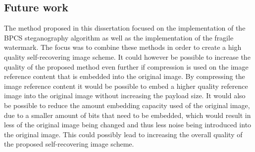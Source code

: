 \documentclass[12pt]{article}
\begin{document}
\subsection{Future work}
The method proposed in this dissertation focused on the implementation of the BPCS steganography algorithm as well as the implementation of the fragile watermark. The focus was to combine these methods in order to create a high quality self-recovering image scheme.
It could however be possible to increase the quality of the proposed method even further if compression is used on the image reference content that is embedded into the original image.
By compressing the image reference content it would be possible to embed a higher quality reference image into the original image without increasing the payload size.
It would also be possible to reduce the amount embedding capacity used of the original image, due to a smaller amount of bits that need to be embedded, which would result in less of the original image being changed and thus less noise being introduced into the original image.
This could possibly lead to increasing the overall quality of the proposed self-recovering image scheme.



\end{document}
